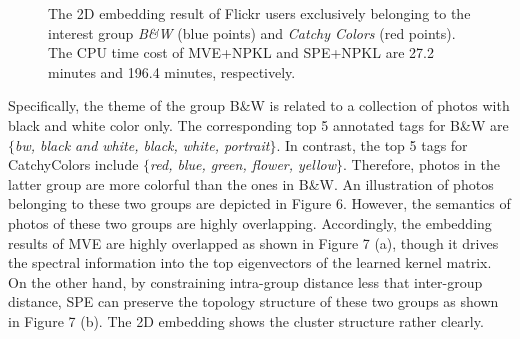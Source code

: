 \begin{figure}[htbp]
\begin{center}
\caption{The 2D embedding result of Flickr users exclusively belonging to the interest group {\em B\&W} (blue points) and  {\em Catchy Colors} (red points). The CPU time cost of MVE+NPKL and SPE+NPKL are 27.2 minutes and 196.4 minutes, respectively. } \label{fig:flickr}
\end{center}
\end{figure}

Specifically, the theme of the group B\&W is related to a collection of photos with black and white color only. The corresponding top 5 annotated tags for B\&W are $\{${\em bw, black and white, black, white, portrait}$\}$. In contrast, the top 5 tags for CatchyColors include $\{${\em red, blue, green, flower, yellow}$\}$. Therefore, photos in the latter group are more colorful than the ones in B\&W. An illustration of photos belonging to these two groups are depicted in Figure 6. However, the semantics of photos of these two groups are highly overlapping. Accordingly, the embedding results of MVE are highly overlapped as shown in Figure 7 (a), though it drives the spectral information into the top eigenvectors of the learned kernel matrix. On the other hand, by constraining intra-group distance less that inter-group distance, SPE can preserve the topology structure of these two groups as shown in Figure 7 (b). The 2D embedding shows the cluster structure rather clearly.

